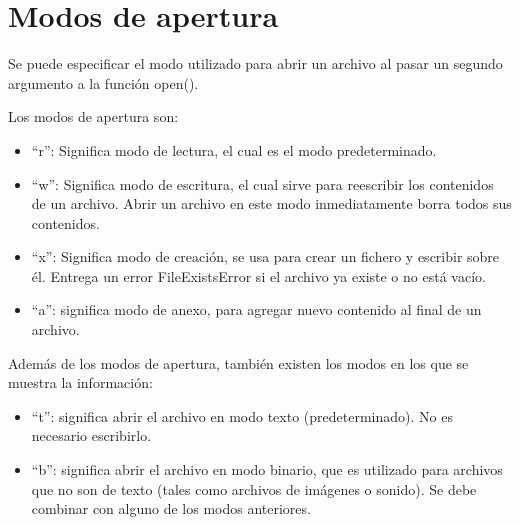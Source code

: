 \documentclass{report}
\newcommand{\doble}[1]{``#1''}
\begin{document}
{\section{Modos de apertura}

Se puede especificar el modo utilizado para abrir un archivo al pasar un segundo argumento a la función open().

Los modos de apertura son:

\begin{itemize}
  \item \doble{r}: Significa modo de lectura, el cual es el modo predeterminado.
  

  \item \doble{w}: Significa modo de escritura, el cual sirve para reescribir los contenidos de un archivo. Abrir un archivo en este modo inmediatamente borra todos sus contenidos.
  

  \item \doble{x}: Significa modo de creación, se usa para crear un fichero y escribir sobre él. Entrega un error FileExistsError si el archivo ya existe o no está vacío.
  

  \item \doble{a}: significa modo de anexo, para agregar nuevo contenido al final de un archivo.


\end{itemize}

Además de los modos de apertura, también existen los modos en los que se muestra la información:

\begin{itemize}
  \item \doble{t}: significa abrir el archivo en modo texto (predeterminado). No es necesario escribirlo.
  \item \doble{b}: significa abrir el archivo en modo binario, que es utilizado para archivos que no son de texto (tales como archivos de imágenes o sonido). Se debe combinar con alguno de los modos anteriores.


\end{itemize}

}
\end{document}
